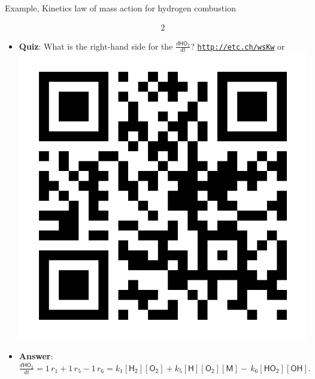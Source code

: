 \begin{frame}{Example, Kinetics law of mass action for hydrogen combustion}
\begin{itemize}
{\begin{alignat*}{2}
			\end{alignat*}
		}
		\item \alert{\bf Quiz}: What is the right-hand side for the $\tfrac{d\mathsf{HO_2}}{dt}$?
			\href{http://etc.ch/wsKw}{\textcolor{indigo(dye)}{\tt http://etc.ch/wsKw}} \quad or \quad
			\includegraphics[height=0.08\columnwidth]{figures/chemical-kinetics/polls.png}
		\vskip 10pt
		\hiddenpause
		\item {\bf Answer}:  $\tfrac{d\mathsf{HO_2}}{dt} = 1 \, r_1  + 1 \, r_5 -1  \, r_6 = k_1  \mathsf{[H_2][O_2] } + k_5  \mathsf{[H][O_2][M]}  - \, k_6  \mathsf{[HO_2][OH] }.$
	\end{itemize}
\end{frame}
%
%
